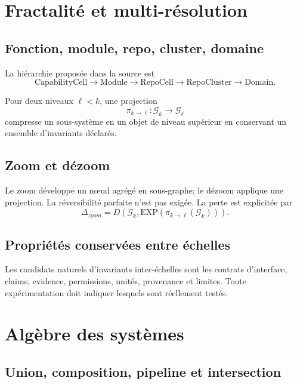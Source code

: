 \chapter{Fractalité et multi-résolution}

\section{Fonction, module, repo, cluster, domaine}

La hiérarchie proposée dans la source est
\[
\mathrm{CapabilityCell}\rightarrow\mathrm{Module}\rightarrow\mathrm{RepoCell}\rightarrow\mathrm{RepoCluster}\rightarrow\mathrm{Domain}.
\]

\begin{definition}
Pour deux niveaux $\ell<k$, une projection
\[
\pi_{k\rightarrow\ell}:\mathcal G_k\rightarrow\mathcal G_\ell
\]
compresse un sous-système en un objet de niveau supérieur en conservant un ensemble d'invariants déclarés.
\end{definition}

\section{Zoom et dézoom}

Le zoom développe un nœud agrégé en sous-graphe; le dézoom applique une projection. La réversibilité parfaite n'est pas exigée. La perte est explicitée par
\[
\Delta_{zoom}=D(\mathcal G_k,\mathrm{EXP}(\pi_{k\rightarrow\ell}(\mathcal G_k))).
\]

\section{Propriétés conservées entre échelles}

Les candidats naturels d'invariants inter-échelles sont les contrats d'interface, claims, evidence, permissions, unités, provenance et limites. Toute expérimentation doit indiquer lesquels sont réellement testés.

\chapter{Algèbre des systèmes}

\section{Union, composition, pipeline et intersection}

